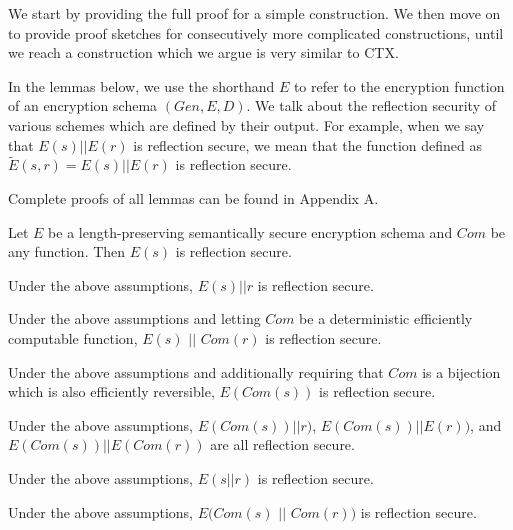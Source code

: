 We start by providing the full proof for a simple construction. We then move on
to provide proof sketches for consecutively more complicated constructions,
until we reach a construction which we argue is very similar to CTX.

In the lemmas below, we use the shorthand $E$ to refer to the encryption
function of an encryption schema $(Gen, E, D)$. We talk about the reflection
security of various schemes which are defined by their output. For example,
when we say that $E(s) || E(r)$ is reflection secure, we mean that the function
defined as $\widetilde{E}(s, r) = E(s) || E(r)$ is reflection secure.

Complete proofs of all lemmas can be found in Appendix A.

\begin{lemma}
    Let $E$ be a length-preserving semantically secure encryption schema and
    $Com$ be any function. Then $E(s)$ is reflection secure.
\end{lemma}

\begin{lemma}
    Under the above assumptions, $E(s) || r$ is reflection secure.
\end{lemma}

\begin{lemma}
    Under the above assumptions and letting $Com$ be a deterministic
    efficiently computable function, $E(s)$ $||$ $Com(r)$ is reflection secure.
\end{lemma}

\begin{lemma}
    Under the above assumptions and additionally requiring that $Com$ is a
    bijection which is also efficiently reversible, $E(Com(s))$ is reflection secure.
\end{lemma}

\begin{lemma}
    Under the above assumptions, $E(Com(s)) || r)$, \break$E(Com(s)) || E(r))$, and
    $E(Com(s)) || E(Com(r))$ are all reflection secure.
\end{lemma}

\begin{lemma}
    Under the above assumptions, $E(s || r)$ is reflection secure.
\end{lemma}

\begin{lemma}
    Under the above assumptions, $E(Com(s)$ $||$ $Com(r))$ is reflection secure.
\end{lemma}


